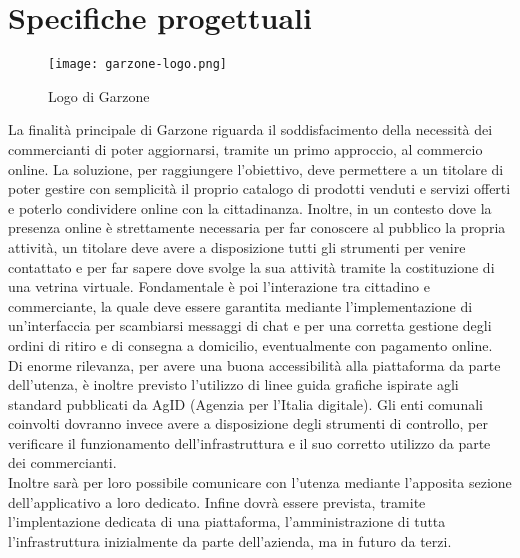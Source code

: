 \section{Specifiche progettuali}
\begin{figure}[!htb]
    \centering
    \texttt{[image: garzone-logo.png]}
    \caption{Logo di Garzone}
\end{figure}
La finalità principale di Garzone riguarda il soddisfacimento della necessità dei commercianti di poter aggiornarsi, tramite un primo approccio, al commercio online. La soluzione, per raggiungere l'obiettivo, deve permettere a un titolare di poter gestire con semplicità il proprio catalogo di prodotti venduti e servizi offerti e poterlo condividere online con la cittadinanza. Inoltre, in un contesto dove la presenza online è strettamente necessaria per far conoscere al pubblico la propria attività, un titolare deve avere a disposizione tutti gli strumenti per venire contattato e per far sapere dove svolge la sua attività tramite la costituzione di una vetrina virtuale. Fondamentale è poi l'interazione tra cittadino e commerciante, la quale deve essere garantita mediante l'implementazione di un'interfaccia per scambiarsi messaggi di chat e per una corretta gestione degli ordini di ritiro e di consegna a domicilio, eventualmente con pagamento online. \\Di enorme rilevanza, per avere una buona accessibilità alla piattaforma da parte dell'utenza, è inoltre previsto l'utilizzo di linee guida grafiche ispirate agli standard pubblicati da AgID (Agenzia per l'Italia digitale)\cite{AGID}. Gli enti comunali coinvolti dovranno invece avere a disposizione degli strumenti di controllo, per verificare il funzionamento dell'infrastruttura e il suo corretto utilizzo da parte dei commercianti. \\Inoltre sarà per loro possibile comunicare con l'utenza mediante l'apposita sezione dell'applicativo a loro dedicato. Infine dovrà essere prevista, tramite l'implentazione dedicata di una piattaforma, l'amministrazione di tutta l'infrastruttura inizialmente da parte dell'azienda, ma in futuro da terzi. 

